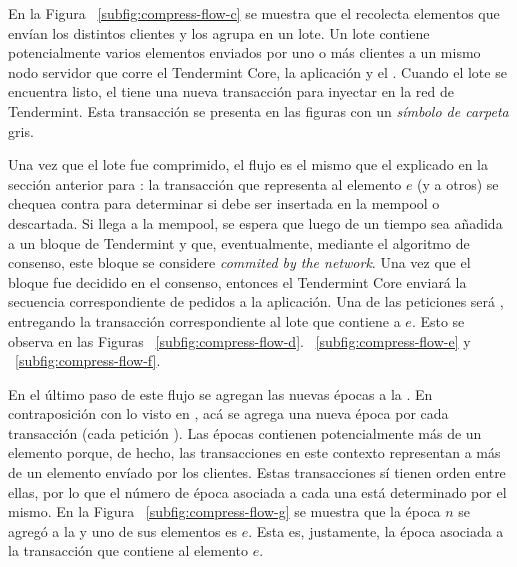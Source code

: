 %

En la Figura ~\ref{subfig:compress-flow-c} se muestra que el \collector recolecta elementos que envían los distintos clientes y los agrupa
en un lote.
Un lote contiene potencialmente varios elementos enviados por uno o más clientes a un mismo nodo servidor
que corre el Tendermint Core, la aplicación y el \collector.
Cuando el lote se encuentra listo, el \collector tiene una nueva transacción para inyectar en la red de Tendermint.
Esta transacción se presenta en las figuras con un \textit{símbolo de carpeta} gris.

%

Una vez que el lote fue comprimido, el flujo es el mismo que el explicado en la sección anterior para \vanilla: la transacción
que representa al elemento $e$ (y a otros) se chequea contra \CheckTx para determinar si debe ser insertada
en la mempool o descartada.
%
Si llega a la mempool, se espera que luego de un tiempo sea añadida a un bloque de Tendermint y que, eventualmente,
mediante el algoritmo de consenso, este bloque se considere \textit{commited by the network}.
%
Una vez que el bloque fue decidido en el consenso, entonces el Tendermint Core enviará
la secuencia correspondiente de pedidos a la aplicación.
%
Una de las peticiones será \DeliverTx, entregando la transacción correspondiente al lote que contiene a $e$.
%
Esto se observa en las Figuras ~\ref{subfig:compress-flow-d}. ~\ref{subfig:compress-flow-e} y ~\ref{subfig:compress-flow-f}.

%
En el último paso de este flujo se agregan las nuevas épocas a la \setchain.
En contraposición con lo visto en \vanilla, acá se agrega una nueva época por cada transacción (cada petición \DeliverTx).
Las épocas contienen potencialmente más de un elemento porque, de hecho, las transacciones en este contexto representan a más de un elemento
envíado por los clientes.
Estas transacciones sí tienen orden entre ellas, por lo que el número de época asociada a cada una está determinado por el mismo.
En la Figura ~\ref{subfig:compress-flow-g} se muestra que la época $n$ se agregó a la \setchain y uno de sus elementos es $e$. Esta es, justamente, la época asociada
a la transacción que contiene al elemento $e$.


